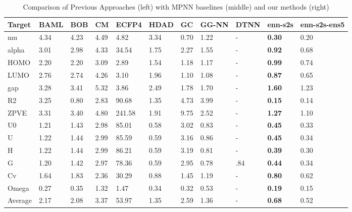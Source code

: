 \documentclass{article}
\begin{document}
\begin{table*}[t]
\centering
\caption{Comparison of Previous Approaches (left) with MPNN baselines (middle) and our methods (right)}
\abovespace\belowspace
\label{tb:main}
\begin{tabular}{llllll|lll|ll}
\hline
Target & BAML & BOB  & CM   & ECFP4  & HDAD & GC & GG-NN & DTNN & enn-s2s & enn-s2s-ens5 \\
\hline
\abovespace
mu     & 4.34 & 4.23 & 4.49 & 4.82   & 3.34   & 0.70 & 1.22  & - & \textbf{0.30}    & 0.20            \\
alpha  & 3.01 & 2.98 & 4.33 & 34.54  & 1.75   & 2.27 & 1.55  & - & \textbf{0.92}    & 0.68            \\
HOMO   & 2.20 & 2.20 & 3.09 & 2.89   & 1.54   & 1.18 & 1.17  & - & \textbf{0.99}    & 0.74            \\
LUMO   & 2.76 & 2.74 & 4.26 & 3.10   & 1.96   & 1.10 & 1.08  & - & \textbf{0.87}    & 0.65            \\
gap    & 3.28 & 3.41 & 5.32 & 3.86   & 2.49   & 1.78 & 1.70  & - & \textbf{1.60}    & 1.23            \\
R2     & 3.25 & 0.80 & 2.83 & 90.68  & 1.35   & 4.73 & 3.99  & - & \textbf{0.15}    & 0.14            \\
ZPVE   & 3.31 & 3.40 & 4.80 & 241.58 & 1.91   & 9.75 & 2.52  & - & \textbf{1.27}    & 1.10            \\
U0     & 1.21 & 1.43 & 2.98 & 85.01  & 0.58   & 3.02 & 0.83  & - & \textbf{0.45}    & 0.33            \\
U      & 1.22 & 1.44 & 2.99 & 85.59  & 0.59   & 3.16 & 0.86  & - & \textbf{0.45}    & 0.34            \\
H      & 1.22 & 1.44 & 2.99 & 86.21  & 0.59   & 3.19 & 0.81  & - & \textbf{0.39}    & 0.30            \\
G      & 1.20 & 1.42 & 2.97 & 78.36  & 0.59   & 2.95 & 0.78  & .84\footnotemark & \textbf{0.44}    & 0.34            \\
Cv     & 1.64 & 1.83 & 2.36 & 30.29  & 0.88   & 1.45 & 1.19  & - & \textbf{0.80}    & 0.62            \\
Omega  & 0.27 & 0.35 & 1.32 & 1.47   & 0.34   & 0.32 & 0.53  & - & \textbf{0.19}    & 0.15            \\
\hline
Average &	2.17 &	2.08 &	3.37 &	53.97 &	1.35 &		2.59 &	1.36 & - &	\textbf{0.68} &	0.52  \\
\end{tabular}
\end{table*}
\end{document}

